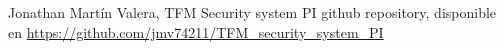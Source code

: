 \begin{thebibliography}{99}

	 Jonathan Martín Valera, TFM Security system PI github repository, disponible en \url{https://github.com/jmv74211/TFM_security_system_PI}

	
	

\end{thebibliography}